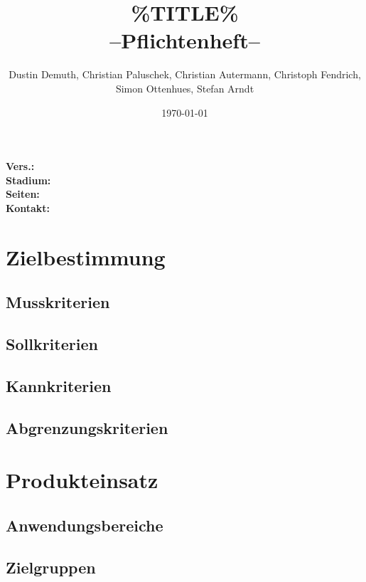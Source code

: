 \documentclass[a4paper,11pt]{article}             %
\begin{document}
\title{\%TITLE\% \\ \small --Pflichtenheft--}
\author{Dustin Demuth, Christian Paluschek, Christian Autermann, Christoph Fendrich, Simon Ottenhues, Stefan Arndt}
\date{\today}
\status{}
\maketitle
\thispagestyle{empty}

\begin{center}
\bf Vers.: \MyVersion \\
\bf Stadium: \MyStatus\\
\bf Seiten: \thelastpage \\
\bf Kontakt: \email \\
\end{center}
\newpage

\tableofcontents

\newpage

\section{Zielbestimmung}
	\subsection{Musskriterien}
	\subsection{Sollkriterien}
	\subsection{Kannkriterien}
	\subsection{Abgrenzungskriterien}
\section{Produkteinsatz}
	\subsection{Anwendungsbereiche}
	\subsection{Zielgruppen}
\end{document}
